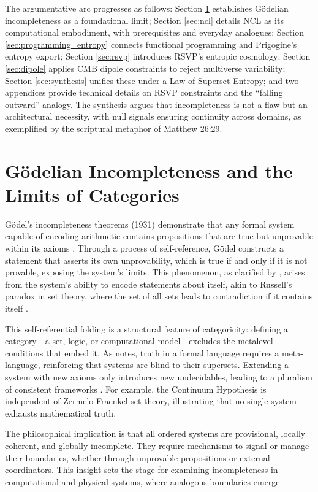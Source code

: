 \documentclass{article}
\begin{document}
The argumentative arc progresses as follows: Section \ref{sec:godel} establishes G\"{o}delian incompleteness as a foundational limit; Section \ref{sec:ncl} details NCL as its computational embodiment, with prerequisites and everyday analogues; Section \ref{sec:programming_entropy} connects functional programming and Prigogine's entropy export; Section \ref{sec:rsvp} introduces RSVP's entropic cosmology; Section \ref{sec:dipole} applies CMB dipole constraints to reject multiverse variability; Section \ref{sec:synthesis} unifies these under a Law of Superset Entropy; and two appendices provide technical details on RSVP constraints and the ``falling outward'' analogy. The synthesis argues that incompleteness is not a flaw but an architectural necessity, with null signals ensuring continuity across domains, as exemplified by the scriptural metaphor of Matthew 26:29.

\section{G\"{o}delian Incompleteness and the Limits of Categories}
\label{sec:godel}
G\"{o}del's incompleteness theorems (1931) demonstrate that any formal system capable of encoding arithmetic contains propositions that are true but unprovable within its axioms \citep{godel1931}. Through a process of self-reference, G\"{o}del constructs a statement that asserts its own unprovability, which is true if and only if it is not provable, exposing the system's limits. This phenomenon, as clarified by \citet{nagel1958}, arises from the system's ability to encode statements about itself, akin to Russell's paradox in set theory, where the set of all sets leads to contradiction if it contains itself \citep{tarski1956}.

This self-referential folding is a structural feature of categoricity: defining a category---a set, logic, or computational model---excludes the metalevel conditions that embed it. As \citet{tarski1956} notes, truth in a formal language requires a meta-language, reinforcing that systems are blind to their supersets. Extending a system with new axioms only introduces new undecidables, leading to a pluralism of consistent frameworks \citep{nagel1958}. For example, the Continuum Hypothesis is independent of Zermelo-Fraenkel set theory, illustrating that no single system exhausts mathematical truth.

The philosophical implication is that all ordered systems are provisional, locally coherent, and globally incomplete. They require mechanisms to signal or manage their boundaries, whether through unprovable propositions or external coordinators. This insight sets the stage for examining incompleteness in computational and physical systems, where analogous boundaries emerge.
\end{document}
